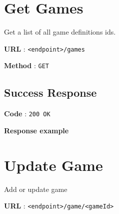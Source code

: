 \begin{Shaded}
\begin{Highlighting}[]
                        \NormalTok{:}\NormalTok{,}
                        \NormalTok{:}\NormalTok{,}
                        \NormalTok{:}\NormalTok{,}
                        \NormalTok{:}
                     \NormalTok{\}}
                  \NormalTok{\},}
                  \NormalTok{:}
               \NormalTok{\}}
            \NormalTok{\}}
         \NormalTok{\}}
      \NormalTok{\}}
   \NormalTok{\}}
\NormalTok{]}
\end{Highlighting}
\end{Shaded}

\section{Get Games}\label{get-games}

Get a list of all game definitions ids.

\textbf{URL} : \texttt{\textless{}endpoint\textgreater{}/games}

\textbf{Method} : \texttt{GET}

\subsection{Success Response}\label{success-response-4}

\textbf{Code} : \texttt{200 OK}

\textbf{Response example}

\begin{Shaded}
\begin{Highlighting}[]
\NormalTok{[}
    \NormalTok{,}
    \NormalTok{,}
\NormalTok{]}
\end{Highlighting}
\end{Shaded}

\section{Update Game}\label{update-game}

Add or update game

\textbf{URL} :
\texttt{\textless{}endpoint\textgreater{}/game/\textless{}gameId\textgreater{}}

